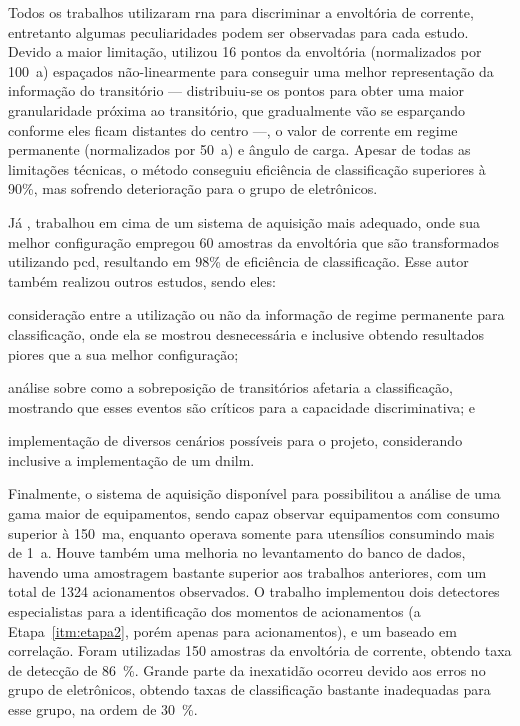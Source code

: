 Todos os trabalhos utilizaram \gls{rna} para discriminar a envoltória
de corrente, entretanto algumas peculiaridades podem ser observadas
para cada estudo. Devido a maior limitação, \citet*{nilm_cepel_aguiar}
utilizou 16 pontos da envoltória (normalizados por 100~\acs{a})
espaçados não-linearmente para conseguir uma melhor representação da
informação do transitório --- distribuiu-se os pontos para obter uma
maior granularidade próxima ao transitório, que gradualmente vão se
esparçando conforme eles ficam distantes do centro ---, o valor de
corrente em regime permanente (normalizados por 50~\acs{a}) e
ângulo de carga. Apesar de todas as limitações técnicas, o método
conseguiu eficiência de classificação superiores à 90\%, mas sofrendo
deterioração para o grupo de eletrônicos. 

Já \citet*{nilm_cepel_bezerra}, trabalhou em cima de um sistema
de aquisição mais adequado, onde sua melhor configuração empregou 60 amostras
da envoltória que são transformados utilizando \gls{pcd}, resultando
em 98\% de eficiência de classificação.  Esse autor também realizou
outros estudos, sendo eles:
\begin{enumerate*}[label=\itshape\alph*\upshape)] 
\item consideração entre a utilização ou não da informação de regime
permanente para classificação, onde ela se mostrou desnecessária e
inclusive obtendo resultados piores que a sua melhor configuração; 
\item análise sobre como a sobreposição de transitórios afetaria a
classificação, mostrando que esses eventos são críticos para a
capacidade discriminativa; e 
\item implementação de diversos cenários possíveis para o projeto,
considerando inclusive a implementação de um \gls{dnilm}.  
\end{enumerate*}

Finalmente, o sistema de aquisição disponível para
\citet*{nilm_cepel_alvaro} possibilitou a análise de uma gama
maior de equipamentos, sendo capaz observar equipamentos com
consumo superior à 150~m\acs{a}, enquanto
\citet*{nilm_cepel_aguiar} operava somente para utensílios consumindo
mais de 1~\acs{a}. Houve também uma melhoria no
levantamento do banco de dados, havendo uma amostragem bastante
superior aos trabalhos anteriores, com um total de 1324 acionamentos
observados. O trabalho implementou dois detectores especialistas para
a identificação dos momentos de acionamentos (a
Etapa~\ref{itm:etapa2}, porém apenas para acionamentos), e um baseado
em correlação. Foram utilizadas 150 amostras da envoltória de
corrente, obtendo taxa de detecção de 86~\%.  Grande parte da
inexatidão ocorreu devido aos erros no grupo de eletrônicos, obtendo
taxas de classificação bastante inadequadas para esse grupo, na ordem
de 30~\%.

